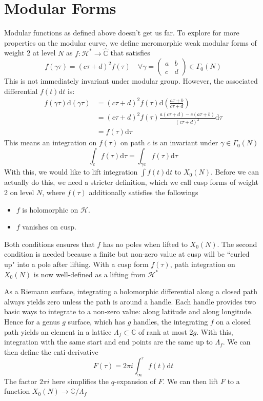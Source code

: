 \documentclass[]{article}
\newcommand{\ud}{\mathrm{d}}
\begin{document}
\section{Modular Forms}
Modular functions as defined above doesn't get us far. To explore for more properties on the modular curve, we define meromorphic weak modular forms of weight 2 at level $N$ as $f:\mathcal{H}^*\to\hat{\mathbb{C}}$ that satisfies
\[
f(\gamma\tau) = (c\tau +d)^2f(\tau)\quad \forall \gamma=\left(\begin{matrix}a & b \\ c & d\end{matrix}\right) \in\Gamma_0(N) 
\]
This is not immediately invariant under modular group. However, the associated differential $f(t)\ud t$ is:
\begin{align*}
f(\gamma\tau)\ud(\gamma\tau) &= (c\tau+d)^2f(\tau) \ud\left(\frac{a\tau + b}{c\tau +d}\right) \\
&= (c\tau+d)^2f(\tau) \frac{a(c\tau+d) - c(a\tau + b)}{(c\tau + d)^2} \ud\tau \\
&= f(\tau)\ud \tau
\end{align*}
This means an integration on $f(\tau)$ on path $c$ is an invariant under $\gamma\in\Gamma_0(N)$
\[
\int_c f(\tau)\ud \tau = \int_{\gamma c} f(\tau)\ud \tau
\]
With this, we would like to lift integration $\int f(t)\ud t$ to $X_0(N)$. Before we can actually do this, we need a stricter definition, which we call cusp forms of weight 2 on level $N$, where $f(\tau)$ additionally satisfies the followings
\begin{itemize}
	\item $f$ is holomorphic on $\mathcal{H}$.
	\item $f$ vanishes on cusp.
\end{itemize}
Both conditions ensures that $f$ has no poles when lifted to $X_0(N)$. The second condition is needed because a finite but non-zero value at cusp will be ``curled up" into a pole after lifting. With a cusp form $f(\tau)$, path integration on $X_0(N)$ is now well-defined as a lifting from $\mathcal{H}^*$

As a Riemann surface, integrating a holomorphic differential along a closed path always yields zero unless the path is around a handle. Each handle provides two basic ways to integrate to a non-zero value: along latitude and along longitude. Hence for a genus $g$ surface, which has $g$ handles, the integrating $f$ on a closed path yields an element in a lattice $\Lambda_f\subset \mathbb{C}$ of rank at most $2g$. With this, integration with the same start and end points are the same up to $\Lambda_f$. We can then define the enti-derivative
\[
F(\tau) = 2\pi i \int_{\infty}^{\tau} f(t)\ud t
\] 
The factor $2\pi i$ here simplifies the $q$-expansion of $F$. We can then lift $F$ to a function $X_0(N) \to \mathbb{C} / \Lambda_f$
\end{document}
